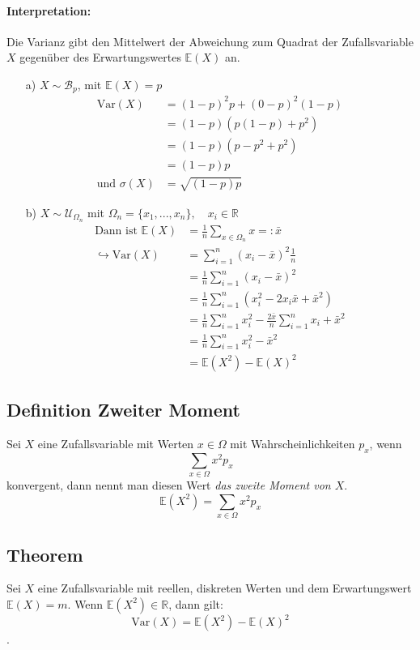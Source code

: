 \documentclass[12pt,a4paper]{article}
\begin{document}
 	\paragraph{Interpretation:}
 	Die Varianz gibt den Mittelwert der Abweichung zum Quadrat der Zufallsvariable $X$ gegenüber des Erwartungswertes $\mathbb{E}(X)$ an.
 	\begin{itemize}
 	\item[a)] $X\sim\mathcal{B}_p$, mit $\mathbb{E}(X)=p$
 	\begin{equation}
 	\begin{split}
 	\text{Var}(X) & = \left(1-p\right)^2 p+\left(0-p\right)^2\left(1-p\right)\\
 	& = \left(1-p\right)\left(p\left(1-p\right)+p^2\right)\\
 	& = \left(1-p\right)\left(p-p^2 + p^2\right)\\
 	& = \left(1-p\right)p\\
 	\text{und } \sigma(X)& = \sqrt{\left(1-p\right)p}
 	\end{split}
 	\end{equation}
 	
 	\item[b)] $X\sim\mathcal{U}_{\Omega_n}$ mit $\Omega_n = \{x_1,...,x_n\},\quad x_i\in\mathbb{R}$
 	\begin{equation*}
 	\begin{split}
 	\text{Dann ist } \mathbb{E}(X)& =\frac{1}{n}\sum_{x\in\Omega_n}x=:\bar{x}\\
 	\hookrightarrow\text{Var}(X)& = \sum_{i=1}^n\left(x_i-\bar{x}\right)^2\frac{1}{n}\\
 	& = \frac{1}{n}\sum_{i=1}^n\left(x_i-\bar{x}\right)^2\\
 	& = \frac{1}{n}\sum_{i=1}^n\left(x_i^2-2x_i\bar{x}+\bar{x}^2\right)\\
 	& = \frac{1}{n}\sum_{i=1}^n x^2_i -\frac{2\bar{x}}{n}\sum_{i=1}^n x_i +\bar{x}^2\\
 	& = \frac{1}{n}\sum_{i=1}^n x_i^2 -\bar{x}^2\\
 	& = \mathbb{E}(X^2)-\mathbb{E}(X)^2
 	\end{split}
 	\end{equation*}
 	\end{itemize}
 	
 	\subsection{Definition Zweiter Moment}
 	Sei $X$ eine Zufallsvariable mit Werten $x\in\Omega$ mit Wahrscheinlichkeiten $p_x$, wenn 
 	$$\sum_{x\in\Omega}x^2p_x$$ 
 	konvergent, dann nennt man diesen Wert \textit{das zweite Moment von $X$}.
 	$$\mathbb{E}(X^2)=\sum_{x\in\Omega}x^2p_x$$
 	\subsection{Theorem}
 	Sei $X$ eine Zufallsvariable mit reellen, diskreten Werten und dem Erwartungswert $\mathbb{E}(X)=m$. Wenn $\mathbb{E}(X^2)\in\mathbb{R}$, dann gilt:
 	$$\text{Var}(X)=\mathbb{E}(X^2)-\mathbb{E}(X)^2$$.
 	
 	
 	
 	
 	
 	
 	
 	
 	
 	
 	
 	
 	
 	
 	
 	
 	
 	
 	
 	
 	
 	
 	
\end{document}
